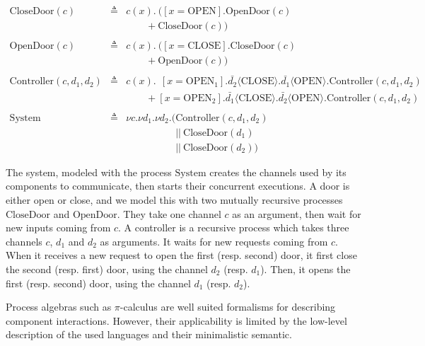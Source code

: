 \begin{example}
  \[
    \begin{array}{rcl}
      \mathrm{CloseDoor}(c)
      & \triangleq
      & c(x) . \ ([x = \mathrm{OPEN}] . \mathrm{OpenDoor}(c) \\
      &
      & \qquad + \mathrm{CloseDoor}(c)) \\
      & & \\
      \mathrm{OpenDoor}(c)
      & \triangleq
      & c(x) . \ ([x = \mathrm{CLOSE}] . \mathrm{CloseDoor}(c) \\
      &
      & \qquad + \mathrm{OpenDoor}(c)) \\
      & & \\
      \mathrm{Controller}(c, d_1, d_2)
      & \triangleq
      & c(x). \ \ [x = \mathrm{OPEN}_1] . \bar{d_2} \langle
        \mathrm{CLOSE} \rangle . \bar{d_1} \langle \mathrm{OPEN} \rangle . \mathrm{Controller}(c, d_1, d_2) \\
      &
      & \qquad + [x = \mathrm{OPEN}_2] . \bar{d_1} \langle
        \mathrm{CLOSE} \rangle . \bar{d_2} \langle \mathrm{OPEN} \rangle. \mathrm{Controller}(c, d_1, d_2) \\
      & & \\
      \mathrm{System}
      & \triangleq
      & \nu c. \nu d_1. \nu d_2. (\mathrm{Controller}(c, d_1, d_2) \\
      &
      & \quad\qquad\qquad ||\ \mathrm{CloseDoor}(d_1) \\
      &
      & \quad\qquad\qquad ||\ \mathrm{CloseDoor}(d_2))
    \end{array}
  \]

  The system, modeled with the process \( \mathrm{System} \) creates the
  channels used by its components to communicate, then starts their concurrent
  executions.
  A door is either open or close, and we model this with two mutually recursive
  processes \( \mathrm{CloseDoor} \) and \( \mathrm{OpenDoor} \).
  They take one channel \( c \) as an argument, then wait for new inputs coming
  from \( c \).
  A controller is a recursive process which takes three channels \( c \),
  \( d_1 \) and \( d_2 \) as arguments.
  It waits for new requests coming from \( c \).
  When it receives a new request to open the first (resp. second) door, it first
  close the second (resp. first) door, using the channel \( d_2 \) (resp.
  \( d_1 \)).
  Then, it opens the first (resp. second) door, using the channel \( d_1 \)
  (resp. \( d_2 \)).
\end{example}

Process algebras such as \( \pi \)-calculus are well suited formalisms for
describing component interactions.
%
However, their applicability is limited by the low-level description of the used
languages and their minimalistic semantic.

